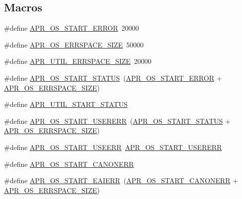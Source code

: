 \subsection*{Macros}
\begin{DoxyCompactItemize}
\item 
\#define \mbox{\hyperlink{group__apr__errno_ga191894048b7bd0cca3cf0bdff1eb695b}{A\+P\+R\+\_\+\+O\+S\+\_\+\+S\+T\+A\+R\+T\+\_\+\+E\+R\+R\+OR}}~20000
\item 
\#define \mbox{\hyperlink{group__apr__errno_gadb8d97e6836ccdc57b43b6119a5acccf}{A\+P\+R\+\_\+\+O\+S\+\_\+\+E\+R\+R\+S\+P\+A\+C\+E\+\_\+\+S\+I\+ZE}}~50000
\item 
\#define \mbox{\hyperlink{group__apr__errno_gaef5e79630739f24d1512d0d044c2bae7}{A\+P\+R\+\_\+\+U\+T\+I\+L\+\_\+\+E\+R\+R\+S\+P\+A\+C\+E\+\_\+\+S\+I\+ZE}}~20000
\item 
\#define \mbox{\hyperlink{group__apr__errno_ga450e1a5734732e092ddaa5b67414f69b}{A\+P\+R\+\_\+\+O\+S\+\_\+\+S\+T\+A\+R\+T\+\_\+\+S\+T\+A\+T\+US}}~(\mbox{\hyperlink{group__apr__errno_ga191894048b7bd0cca3cf0bdff1eb695b}{A\+P\+R\+\_\+\+O\+S\+\_\+\+S\+T\+A\+R\+T\+\_\+\+E\+R\+R\+OR}} + \mbox{\hyperlink{group__apr__errno_gadb8d97e6836ccdc57b43b6119a5acccf}{A\+P\+R\+\_\+\+O\+S\+\_\+\+E\+R\+R\+S\+P\+A\+C\+E\+\_\+\+S\+I\+ZE}})
\item 
\#define \mbox{\hyperlink{group__apr__errno_gadf26297a72afa0ea224e7097fe59a1cd}{A\+P\+R\+\_\+\+U\+T\+I\+L\+\_\+\+S\+T\+A\+R\+T\+\_\+\+S\+T\+A\+T\+US}}
\item 
\#define \mbox{\hyperlink{group__apr__errno_gacd35b2de1e38a1fa4717e38d5e153571}{A\+P\+R\+\_\+\+O\+S\+\_\+\+S\+T\+A\+R\+T\+\_\+\+U\+S\+E\+R\+E\+RR}}~(\mbox{\hyperlink{group__apr__errno_ga450e1a5734732e092ddaa5b67414f69b}{A\+P\+R\+\_\+\+O\+S\+\_\+\+S\+T\+A\+R\+T\+\_\+\+S\+T\+A\+T\+US}} + \mbox{\hyperlink{group__apr__errno_gadb8d97e6836ccdc57b43b6119a5acccf}{A\+P\+R\+\_\+\+O\+S\+\_\+\+E\+R\+R\+S\+P\+A\+C\+E\+\_\+\+S\+I\+ZE}})
\item 
\#define \mbox{\hyperlink{group__apr__errno_ga803b8badf8695bdfa4fbcf4d330371f0}{A\+P\+R\+\_\+\+O\+S\+\_\+\+S\+T\+A\+R\+T\+\_\+\+U\+S\+E\+E\+RR}}~\mbox{\hyperlink{group__apr__errno_gacd35b2de1e38a1fa4717e38d5e153571}{A\+P\+R\+\_\+\+O\+S\+\_\+\+S\+T\+A\+R\+T\+\_\+\+U\+S\+E\+R\+E\+RR}}
\item 
\#define \mbox{\hyperlink{group__apr__errno_ga7bca957c11b80b31cb54b0d2cbe9e025}{A\+P\+R\+\_\+\+O\+S\+\_\+\+S\+T\+A\+R\+T\+\_\+\+C\+A\+N\+O\+N\+E\+RR}}
\item 
\#define \mbox{\hyperlink{group__apr__errno_ga2d04991cb57c67a896e22125a1f22b49}{A\+P\+R\+\_\+\+O\+S\+\_\+\+S\+T\+A\+R\+T\+\_\+\+E\+A\+I\+E\+RR}}~(\mbox{\hyperlink{group__apr__errno_ga7bca957c11b80b31cb54b0d2cbe9e025}{A\+P\+R\+\_\+\+O\+S\+\_\+\+S\+T\+A\+R\+T\+\_\+\+C\+A\+N\+O\+N\+E\+RR}} + \mbox{\hyperlink{group__apr__errno_gadb8d97e6836ccdc57b43b6119a5acccf}{A\+P\+R\+\_\+\+O\+S\+\_\+\+E\+R\+R\+S\+P\+A\+C\+E\+\_\+\+S\+I\+ZE}})

\end{DoxyCompactItemize}
